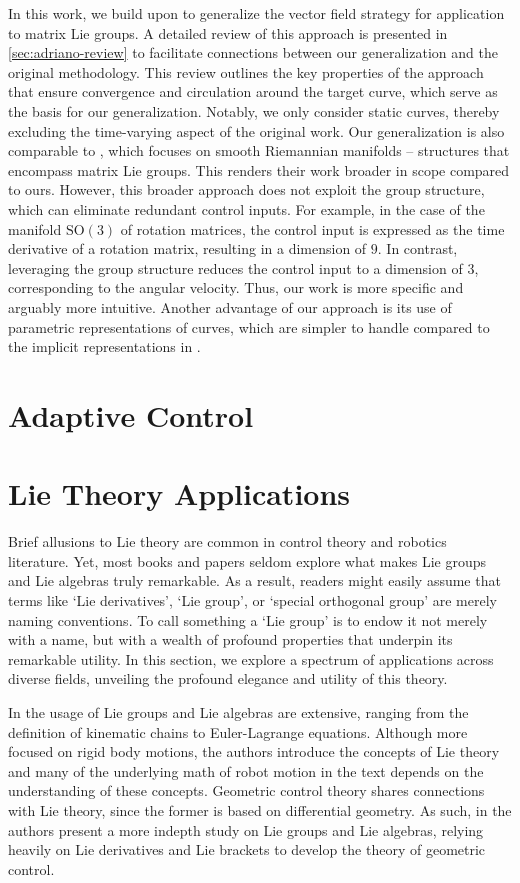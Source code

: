 In this work, we build upon \citet{Rezende2022} to generalize the vector field strategy for application to matrix Lie groups. A detailed review of this approach is presented in \cref{sec:adriano-review} to facilitate connections between our generalization and the original methodology. This review outlines the key properties of the approach that ensure convergence and circulation around the target curve, which serve as the basis for our generalization. Notably, we only consider static curves, thereby excluding the time-varying aspect of the original work. Our generalization is also comparable to \citet{yao2022topological}, which focuses on smooth Riemannian manifolds -- structures that encompass matrix Lie groups. This renders their work broader in scope compared to ours. However, this broader approach does not exploit the group structure, which can eliminate redundant control inputs. For example, in the case of the manifold $\text{SO}(3)$ of rotation matrices, the control input is expressed as the time derivative of a rotation matrix, resulting in a dimension of $9$. In contrast, leveraging the group structure reduces the control input to a dimension of $3$, corresponding to the angular velocity. Thus, our work is more specific and arguably more intuitive. Another advantage of our approach is its use of parametric representations of curves, which are simpler to handle compared to the implicit representations in \citet{yao2022topological}.
\section{Adaptive Control} \label{sec:lit-review-adaptive-control}

\section{Lie Theory Applications} \label{sec:lit-review-lie-theory}
Brief allusions to Lie theory are common in control theory and robotics literature. Yet, most books and papers seldom explore what makes Lie groups and Lie algebras truly remarkable. As a result, readers might easily assume that terms like `Lie derivatives', `Lie group', or `special orthogonal group' are merely naming conventions. To call something a `Lie group' is to endow it not merely with a name, but with a wealth of profound properties that underpin its remarkable utility. In this section, we explore a spectrum of applications across diverse fields, unveiling the profound elegance and utility of this theory.

In \citet{Murray1994} the usage of Lie groups and Lie algebras are extensive, ranging from the definition of kinematic chains to Euler-Lagrange equations. Although more focused on rigid body motions, the authors introduce the concepts of Lie theory and many of the underlying math of robot motion in the text depends on the understanding of these concepts. Geometric control theory shares connections with Lie theory, since the former is based on differential geometry. As such, in \citet{Bullo2004} the authors present a more indepth study on Lie groups and Lie algebras, relying heavily on Lie derivatives and Lie brackets to develop the theory of geometric control. 
